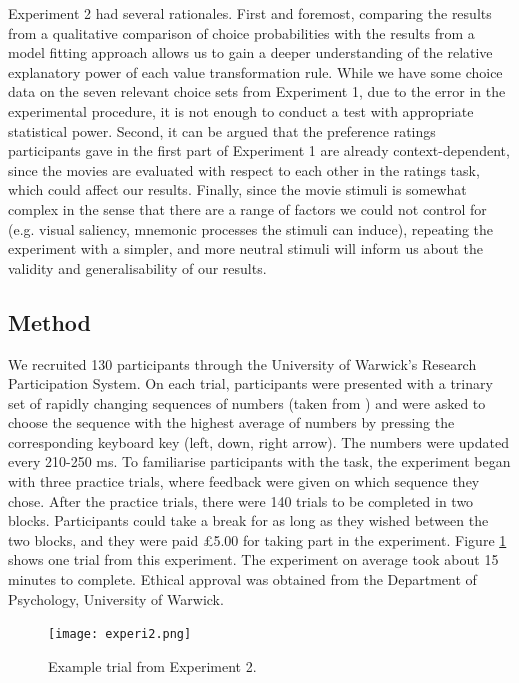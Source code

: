 \documentclass[11pt,a4paper]{article}
\begin{document}
Experiment 2 had several rationales. First and foremost, comparing the results from a qualitative comparison of choice probabilities with the results from a model fitting approach allows us to gain a deeper understanding of the relative explanatory power of each value transformation rule. While we have some choice data on the seven relevant choice sets from Experiment 1, due to the error in the experimental procedure, it is not enough to conduct a test with appropriate statistical power. Second, it can be argued that the preference ratings participants gave in the first part of Experiment 1 are already context-dependent, since the movies are evaluated with respect to each other in the ratings task, which could affect our results. Finally, since the movie stimuli is somewhat complex in the sense that there are a range of factors we could not control for (e.g. visual saliency, mnemonic processes the stimuli can induce), repeating the experiment with a simpler, and more neutral stimuli will inform us about the validity and generalisability of our results. 

\subsection{Method}

We recruited 130 participants through the University of Warwick's Research Participation System. On each trial, participants were presented with a trinary set of rapidly changing sequences of numbers (taken from ) and were asked to choose the sequence with the highest average of numbers by pressing the corresponding keyboard key (left, down, right arrow). The numbers were updated every 210-250 ms. To familiarise participants with the task, the experiment began with three practice trials, where feedback were given on which sequence they chose. After the practice trials, there were 140 trials to be completed in two blocks. Participants could take a break for as long as they wished between the two blocks, and they were paid £5.00 for taking part in the experiment. Figure \ref{fig:experi2_numbers} shows one trial from this experiment. The experiment on average took about 15 minutes to complete. Ethical approval was obtained from the Department of Psychology, University of Warwick.

\begin{figure}
\captionsetup{justification=centering}
\centering
\caption{Example trial from Experiment 2.}
\texttt{[image: experi2.png]}
\label{fig:experi2_numbers}
\end{figure}
\end{document}
